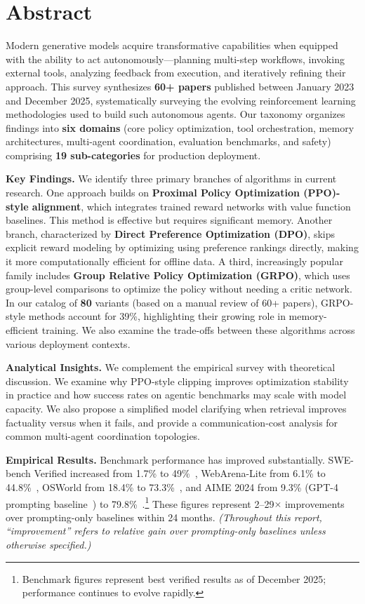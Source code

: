 \documentclass[12pt,a4paper]{report}
\theoremstyle{definition}
\newcommand{\methodN}{80}
\begin{document}

\chapter*{Abstract}

Modern generative models acquire transformative capabilities when equipped with the ability to act autonomously---planning multi-step workflows, invoking external tools, analyzing feedback from execution, and iteratively refining their approach.
 This survey synthesizes \textbf{60+ papers} published between January 2023 and December 2025, systematically surveying the evolving reinforcement learning methodologies used to build such autonomous agents. Our taxonomy organizes findings into \textbf{six domains} (core policy optimization, tool orchestration, memory architectures, multi-agent coordination, evaluation benchmarks, and safety) comprising \textbf{19 sub-categories} for production deployment.

\textbf{Key Findings.} We identify three primary branches of algorithms in current research. One approach builds on \textbf{Proximal Policy Optimization (PPO)-style alignment}, which integrates trained reward networks with value function baselines.
 This method is effective but requires significant memory. Another branch, characterized by \textbf{Direct Preference Optimization (DPO)}, skips explicit reward modeling
 by optimizing using preference rankings directly, making it more computationally efficient for offline data.
 A third, increasingly popular family includes \textbf{Group Relative Policy Optimization (GRPO)}, which uses group-level comparisons to optimize the policy without needing a critic network. In our catalog of \textbf{\methodN} variants (based on a manual review of 60+ papers), GRPO-style methods account for 39\%, highlighting their growing role in memory-efficient training. We also examine the trade-offs between these algorithms across various deployment contexts.

\textbf{Analytical Insights.} We complement the empirical survey with theoretical discussion. We examine why PPO-style clipping improves optimization stability in practice and how success rates on agentic benchmarks may scale with model capacity. We also propose a simplified model clarifying when retrieval improves factuality versus when it fails, and provide a communication-cost analysis for common multi-agent coordination topologies.

\textbf{Empirical Results.} Benchmark performance has improved substantially. SWE-bench Verified increased from 1.7\% to 49\%~\cite{jimenez2024swebench}, WebArena-Lite from 6.1\% to 44.8\%~\cite{zhou2024webarena}, OSWorld from 18.4\% to 73.3\%~\cite{xie2024osworld}, and AIME 2024 from 9.3\% (GPT-4 prompting baseline~\cite{openai2024gpt4turbo}) to 79.8\%~\cite{deepseek2025r1}.\footnote{Benchmark figures represent best verified results as of December 2025; performance continues to evolve rapidly.} These figures represent 2--29$\times$ improvements over prompting-only baselines within 24 months. \emph{(Throughout this report, ``improvement'' refers to relative gain over prompting-only baselines unless otherwise specified.)}
\end{document}
